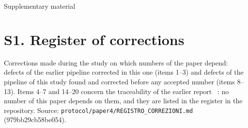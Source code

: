\clearpage
\onecolumn
\begin{center}\Large Supplementary material\end{center}
\section*{S1. Register of corrections}
Corrections made during the study on which numbers of the paper depend: defects of the earlier pipeline corrected in this one (items 1–3) and defects of the pipeline of this study found and corrected before any accepted number (items 8–13). Items 4–7 and 14–20 concern the traceability of the earlier report ~\cite{motion2026uc04}: no number of this paper depends on them, and they are listed in the register in the repository. Source: \texttt{protocol/\allowbreak{}paper4/\allowbreak{}REGISTRO\_\allowbreak{}CORREZIONI.\allowbreak{}md} (979bb29cb58be054).

